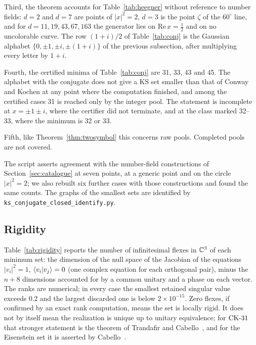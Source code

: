 Third, the theorem accounts for Table~\ref{tab:heegner} without reference to number fields:
$d=2$ and $d=7$ are points of $|x|^2=2$, $d=3$ is the point $\zeta$ of the $60^\circ$ line, and
for $d=11,19,43,67,163$ the generator lies on $\mathrm{Re}\,x=\tfrac12$ and on no uncolorable
curve.  The row $(1+i)/2$ of Table~\ref{tab:conj} is the Gaussian alphabet
$\{0,\pm1,\pm i,\pm(1+i)\}$ of the previous subsection, after multiplying every letter by $1+i$.

Fourth, the certified minima of Table~\ref{tab:conj} are 31, 33, 43 and 45.  The alphabet with
the conjugate does not give a KS set smaller than that of Conway and Kochen at any point where
the computation finished, and among the certified cases 31 is reached only by the integer pool.
The statement is incomplete at $x=\pm1\pm i$, where the certifier did not terminate, and at the
class marked 32--33, where the minimum is 32 or 33.

Fifth, like Theorem~\ref{thm:twosymbol} this concerns raw pools.  Completed pools are not
covered.

The script asserts agreement with the number-field constructions of
Section~\ref{sec:catalogue} at seven points, at a generic point and on the circle $|x|^2=2$;
we also rebuilt six further cases with those constructions and found the same counts.  The
graphs of the smallest sets are identified by \texttt{ks\_conjugate\_closed\_identify.py}.

\subsection{Rigidity}

Table~\ref{tab:rigidity} reports the number of infinitesimal flexes in $\mathbb{C}^3$ of each minimum
set: the dimension of the null space of the Jacobian of the equations $|v_i|^2=1$,
$\langle v_i|v_j\rangle=0$ (one complex equation for each orthogonal pair), minus the $n+8$ dimensions
accounted for by a common unitary and a phase on each vector.  The ranks are numerical; in every
case the smallest retained singular value exceeds $0.2$ and the largest discarded one is below
$2\times10^{-15}$.  Zero flexes, if confirmed by an exact rank computation, means the set is locally rigid.  It does
not by itself mean the
realization is unique up to unitary equivalence; for $\mathrm{CK}\text{-}31$ that stronger statement is the theorem
of Trandafir and Cabello~\cite{TrandafirCabello2025}, and for the Eisenstein set it is asserted by
Cabello~\cite{Cabello2025simplest}.

